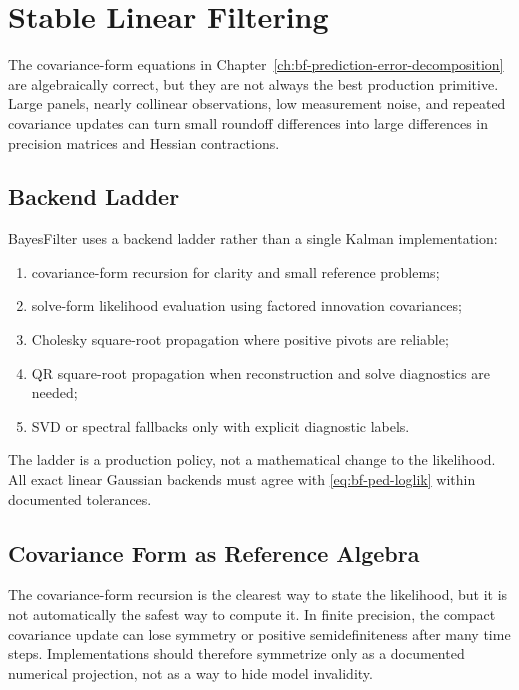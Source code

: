 \chapter{Stable Linear Filtering}
\label{ch:bf-stable-linear-filtering}

The covariance-form equations in Chapter~\ref{ch:bf-prediction-error-decomposition}
are algebraically correct, but they are not always the best production
primitive.  Large panels, nearly collinear observations, low measurement noise,
and repeated covariance updates can turn small roundoff differences into large
differences in precision matrices and Hessian contractions.

\section{Backend Ladder}
\label{sec:bf-linear-backend-ladder}

BayesFilter uses a backend ladder rather than a single Kalman implementation:
\begin{enumerate}[label=(\roman*)]
  \item covariance-form recursion for clarity and small reference problems;
  \item solve-form likelihood evaluation using factored innovation covariances;
  \item Cholesky square-root propagation where positive pivots are reliable;
  \item QR square-root propagation when reconstruction and solve diagnostics are
    needed;
  \item SVD or spectral fallbacks only with explicit diagnostic labels.
\end{enumerate}
The ladder is a production policy, not a mathematical change to the likelihood.
All exact linear Gaussian backends must agree with
\eqref{eq:bf-ped-loglik} within documented tolerances.

\section{Covariance Form as Reference Algebra}
\label{sec:bf-covariance-form-reference}

The covariance-form recursion is the clearest way to state the likelihood, but
it is not automatically the safest way to compute it.  In finite precision, the
compact covariance update can lose symmetry or positive semidefiniteness after
many time steps.  Implementations should therefore symmetrize only as a
documented numerical projection, not as a way to hide model invalidity.


